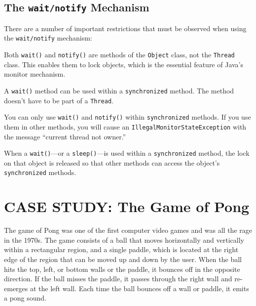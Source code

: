 \subsection*{The {\tt wait/notify} Mechanism}
\noindent There are a number of important restrictions that must be observed
when using the {\tt wait/notify} mechanism:

\begin{BL}
\item  Both {\tt wait()} and {\tt notify()} are methods of the
{\tt Object} class, not the {\tt Thread} class.  This enables
them to lock objects, which is the essential feature of
Java's monitor mechanism.

\item  A {\tt wait()} method can be used within a {\tt synchronized}
method.  The method doesn't have to be part of a {\tt Thread}.


\item  You can only use {\tt wait()} and {\tt notify()}  within
{\tt synchronized} methods.  If you use them in other methods,
you will cause an {\tt Illegal\-Moni\-torStateException} with
the message ``current thread not owner.''

\item  When a {\tt wait()}---or a {\tt sleep()}---is used within a
{\tt synchronized} method, the lock on that object is released
so that other methods can access the object's {\tt synchronized}
methods.
\end{BL}


\section{CASE STUDY: The Game of Pong}

The game of Pong was one of the first computer video games and was all
the rage in the 1970s. The game consists of a ball that moves
horizontally and vertically within a rectangular region, and a single
paddle, which is located at the right edge of the region that can
be moved up and down by the user. When the ball hits the top, left,
or bottom walls or the paddle, it bounces off in the opposite
direction. If the ball misses the paddle, it passes through the right
wall and re-emerges at the left wall. Each time the ball bounces off
a wall or paddle, it emits a pong sound.

